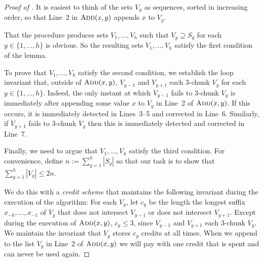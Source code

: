 \documentclass[kpfonts]{patmorin}
\newcommand{\snote}[1]{\fcolorbox{red}{yellow}{#1}}
\newcommand{\pnote}[1]{\ \newline\noindent\fcolorbox{red}{yellow}{\begin{minipage}{\textwidth}#1\end{minipage}}}
\let\le\leqslant
\let\ge\geqslant
\begin{document}
\begin{proof}[Proof of ]
  It is easiest to think of the sets $V_y$ as sequences, sorted in increasing order, so that Line~2 in $\textsc{Add}(x,y)$ appends $x$ to $V_y$.

  That the procedure produces sets $V_1,\ldots,V_h$ such that $V_y\supseteq S_y$ for each $y\in\{1,\ldots,h\}$ is obvious.  So the resulting sets $V_1,\ldots,V_h$ satisfy the first condition of the lemma.

  To prove that $V_1,\ldots,V_h$ satisfy the second condition, we establish the loop invariant that, outside of $\textsc{Add}(x,y)$, $V_{y-1}$ and $V_{y+1}$ each 3-chunk  $V_y$ for each $y\in\{1,\ldots,h\}$.  Indeed, the only instant at which $V_{y-1}$ fails to 3-chunk $V_y$ is immediately after appending some value $x$ to $V_y$ in Line~2 of $\textsc{Add}(x,y)$.  If this occurs, it is immediately detected in Lines~3--5 and corrected in Line~6.  Similarly, if $V_{y+1}$ fails to $3$-chunk $V_y$ then this is immediately detected and corrected in Line~7.

  Finally, we need to argue that $V_1,\ldots,V_h$ satisfy the third condition.
  For convenience, define $n:=\sum_{y=1}^h |S_y|$ so that our task is to show that $\sum_{y=1}^h |V_y|\le 2n$.

  We do this with a \emph{credit scheme} that maintains the following invariant  during the execution of the algorithm:  For each $V_y$, let $c_y$ be the length the longest suffix $x_{-k},\ldots,x_{-1}$ of $V_y$ that does not intersect $V_{y-1}$ or does not intersect $V_{y+1}$.  Except during the execution of $\textsc{Add}(x,y)$, $c_y\le 3$, since $V_{y-1}$ and $V_{y+1}$ each 3-chunk $V_y$.  We maintain the invariant that $V_{y}$ stores $c_y$ credits at all times.  When we append to the list $V_y$ in Line~2 of $\textsc{Add}(x,y)$ we will pay with one credit that is spent and can never be used again.


\end{proof}
\end{document}
